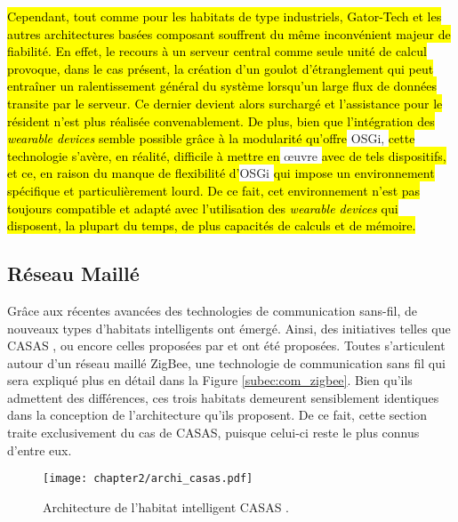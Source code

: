 \hl{Cependant, tout comme pour les habitats de type industriels, Gator-Tech et les autres architectures basées composant souffrent du même inconvénient majeur de fiabilité. En effet, le recours à un serveur central comme seule unité de calcul provoque, dans le cas présent, la création d'un goulot d'étranglement qui peut entraîner un ralentissement général du système lorsqu'un large flux de données transite par le serveur. Ce dernier devient alors surchargé et l'assistance pour le résident n'est plus réalisée convenablement. De plus, bien que l'intégration des \textit{wearable devices} semble possible grâce à la modularité qu'offre} \acs{OSGi}, \hl{cette technologie s'avère, en réalité, difficile à mettre en} \oe{}uvre \hl{avec de tels dispositifs, et ce, en raison du manque de flexibilité d'}\acs{OSGi} \hl{qui impose un environnement spécifique et particulièrement lourd. De ce fait, cet environnement n'est pas toujours compatible et adapté avec l'utilisation des \textit{wearable devices} qui disposent, la plupart du temps, de plus capacités de calculs et de mémoire.}

\subsection{Réseau Maillé}

Grâce aux récentes avancées des technologies de communication sans-fil, de nouveaux types d'habitats intelligents ont émergé. Ainsi, des initiatives telles que CASAS \citep{Cook2013}, ou encore celles proposées par \cite{Zhihua2016} et \cite{Zhenyu2011} ont été proposées. Toutes s'articulent autour d'un réseau maillé ZigBee, une technologie de communication sans fil qui sera expliqué plus en détail dans la Figure \ref{subec:com_zigbee}. Bien qu'ils admettent des différences, ces trois habitats demeurent sensiblement identiques dans la conception de l'architecture qu'ils proposent. De ce fait, cette section traite exclusivement du cas de CASAS, puisque celui-ci reste le plus connus d'entre eux.

\begin{figure}[H]
	\centering
	\texttt{[image: chapter2/archi\_casas.pdf]}
	\caption[Architecture de l'habitat intelligent CASAS.]{Architecture de l'habitat intelligent CASAS \citep{Cook2013}.}
	\label{fig:archi_casas}
\end{figure}


